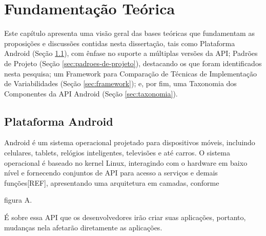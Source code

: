 \chapter{Fundamentação Teórica} \label{ch:fundamentacao-teorica}

Este capítulo apresenta uma visão geral das bases teóricas que fundamentam as
proposições  e  discussões  contidas  nesta  dissertação,  tais  como  Plataforma
Android (Seção \ref{sec:plataforma-android}), com ênfase no suporte a múltiplas
versões da API; Padrões de Projeto (Seção  \ref{sec:padroes-de-projeto}),
destacando os que foram identificados nesta pesquisa;  um Framework para Comparação
de Técnicas de Implementação de Variabilidades (Seção \ref{sec:framework}); e,
por fim, uma Taxonomia dos Componentes da API Android (Seção \ref{sec:taxonomia}). 

\section{Plataforma Android} \label{sec:plataforma-android}

Android é um sistema operacional projetado para dispositivos móveis, incluindo
celulares, tablets, relógios inteligentes, televisões e até carros. O sistema
operacional é baseado no kernel Linux, interagindo com o hardware em baixo nível
e fornecendo conjuntos de API para acesso a serviços e demais funções[REF],
apresentando uma arquitetura em camadas, conforme 

figura A. 

É sobre essa API que
os desenvolvedores irão criar suas aplicações, portanto, mudanças nela afetarão
diretamente as aplicações.

